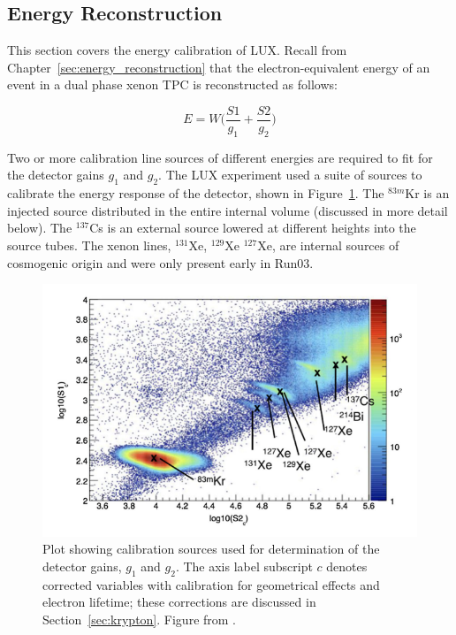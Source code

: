 \subsection{Energy Reconstruction}
This section covers the energy calibration of \ac{LUX}. Recall from Chapter~\ref{sec:energy_reconstruction} that the electron-equivalent energy of an event in a dual phase xenon \ac{TPC} is reconstructed as follows:

\begin{equation}
E = W \Big(\frac{S1}{g_{1}} + \frac{S2}{g_{2}}\Big)
\end{equation}

Two or more calibration line sources of different energies are required to fit for the detector gains $g_{1}$ and $g_{2}$. The \ac{LUX} experiment used a suite of sources to calibrate the energy response of the detector, shown in Figure~\ref{fig:calib_sources}. The $^{83m}$Kr is an injected source distributed in the entire internal volume (discussed in more detail below). The $^{137}$Cs is an external source lowered at different heights into the source tubes. The xenon lines, $^{131}$Xe, $^{129}$Xe $^{127}$Xe, are internal sources of cosmogenic origin and were only present early in Run03.

\begin{figure}[htbp]
\begin{center}
\includegraphics[width=\textwidth]{figures/lux/calibration_sources.png}
\caption{Plot showing calibration sources used for determination of the detector gains, $g_{1}$ and $g_{2}$. The axis label subscript $c$ denotes corrected variables with calibration for geometrical effects and electron lifetime; these corrections are discussed in Section~\ref{sec:krypton}. Figure from \cite{LUX:Run03Comprehensive}.}
\label{fig:calib_sources}
\end{center}
\end{figure}

